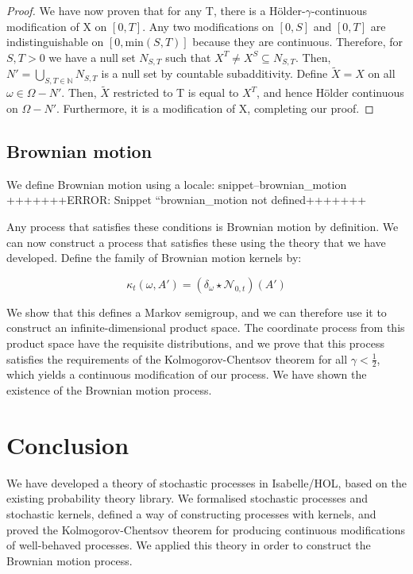 \documentclass[orivec, envcountsame]{llncs}
\newcommand{\Snippet}[1]{%
\ifcsname snippet--#1\endcsname{\csname snippet--#1\endcsname}%
\else+++++++ERROR: Snippet ``#1 not defined+++++++ \fi}
\begin{document}
\begin{proof}
We have now proven that for any T, there is a H{\"o}lder-\(\gamma\)-continuous modification of X on \([0,T]\). Any two modifications on \([0, S]\) and \([0,T]\) are indistinguishable on \([0, \text{min}(S, T)]\) because they are continuous. Therefore, for \(S, T > 0\) we have a null set \(N_{S,T}\) such that \({X^T \neq X^S} \subseteq N_{S,T}\). Then, \(N' = \bigcup_{S, T \in \mathbb{N}} N_{S, T}\) is a null set by countable subadditivity. Define \(\tilde{X} = X\) on all \(\omega \in \Omega - N'\). Then, \(\tilde{X}\) restricted to T is equal to \(X^T\), and hence H{\"older} continuous on \(\Omega - N'\). Furthermore, it is a modification of X, completing our proof.
\end{proof}

\subsection{Brownian motion}\label{sec:brownian-motion}
We define Brownian motion using a locale:
\Snippet{brownian_motion}

Any process that satisfies these conditions is Brownian motion by definition. We can now construct a process that satisfies these using the theory that we have developed. Define the family of Brownian motion kernels by:

\[\kappa_t(\omega, A') = (\delta_\omega \star \mathcal{N}_{0, t})(A')\]

We show that this defines a Markov semigroup, and we can therefore use it to construct an infinite-dimensional product space. The coordinate process from this product space have the requisite distributions, and we prove that this process satisfies the requirements of the Kolmogorov-Chentsov theorem for all \(\gamma < \frac{1}{2}\), which yields a continuous modification of our process. We have shown the existence of the Brownian motion process.

\section{Conclusion}\label{sec:conclusion}
We have developed a theory of stochastic processes in Isabelle/HOL, based on the existing probability theory library. We formalised stochastic processes and stochastic kernels, defined a way of constructing processes with kernels, and proved the Kolmogorov-Chentsov theorem for producing continuous modifications of well-behaved processes. We applied this theory in order to construct the Brownian motion process.
\end{document}
